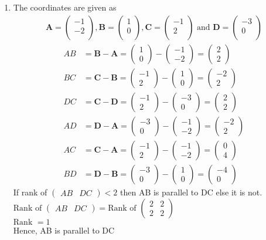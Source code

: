 \documentclass[12pt]{article}
\newcommand{\myvec}[1]{\ensuremath{\begin{pmatrix}#1\end{pmatrix}}}
\let\vec\mathbf
\begin{document}
\begin{enumerate}
\item The coordinates are given as
	\begin{align}
	\vec{A} = \myvec{
		-1\\
		-2\\
		},
	\vec{B} = \myvec{
		1\\
		0\\
		},
	\vec{C} = \myvec{
		-1\\
		2\\
		} \text{ and }
	\vec{D} = \myvec{
		-3\\
		0\\
		}
	\end{align}
	\begin{align}
		AB &= \vec{B} - \vec{A} = \myvec{1\\0} - \myvec{-1\\-2} = \myvec{2\\2}\\
		BC &= \vec{C} - \vec{B} = \myvec{-1\\2} - \myvec{1\\0} = \myvec{-2\\2}\\
		DC &= \vec{C} - \vec{D} = \myvec{-1\\2} - \myvec{-3\\0} = \myvec{2\\2}\\
		AD &= \vec{D} - \vec{A} = \myvec{-3\\0} - \myvec{-1\\-2} = \myvec{-2\\2}\\
		AC &= \vec{C} - \vec{A} = \myvec{-1\\2} - \myvec{-1\\-2} = \myvec{0\\4}\\
		BD &= \vec{D} - \vec{B} = \myvec{-3\\0} - \myvec{1\\0} = \myvec{-4\\0}
	\end{align}
	If rank of $\myvec{AB & DC} < 2$ then AB is parallel to DC else it is not.\\
	$\text{Rank of } \myvec{AB & DC} = \text{Rank of }\myvec{2&2\\2&2}$\\
	$\text{Rank } = 1$\\
	Hence, AB is parallel to DC\\

\end{enumerate}
\end{document}
